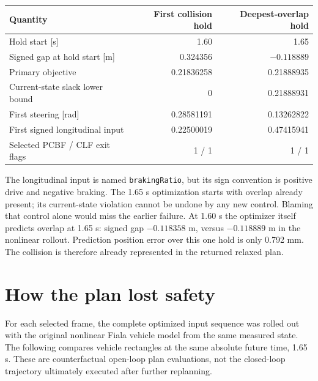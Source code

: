 \documentclass[11pt]{article}
\begin{document}
\begin{center}
\begin{tabular}{lrr}
\toprule
Quantity & First collision hold & Deepest-overlap hold\\
\midrule
Hold start [s] & 1.60 & 1.65\\
Signed gap at hold start [m] & 0.324356 & $-0.118889$\\
Primary objective & 0.21836258 & 0.21888935\\
Current-state slack lower bound & 0 & 0.21888931\\
First steering [rad] & 0.28581191 & 0.13262822\\
First signed longitudinal input & 0.22500019 & 0.47415941\\
Selected PCBF / CLF exit flags & 1 / 1 & 1 / 1\\
\bottomrule
\end{tabular}
\end{center}
The longitudinal input is named \texttt{brakingRatio}, but its sign convention
is positive drive and negative braking. The 1.65 s optimization starts with
overlap already present; its current-state violation cannot be undone by any
new control. Blaming that control alone would miss the earlier failure.
At 1.60 s the optimizer itself predicts overlap at 1.65 s: signed gap
$-0.118358$ m, versus $-0.118889$ m in the nonlinear rollout. Prediction
position error over this one hold is only 0.792 mm. The collision is therefore
already represented in the returned relaxed plan.

\section{How the plan lost safety}
For each selected frame, the complete optimized input sequence was rolled
out with the original nonlinear Fiala vehicle model from the same measured
state. The following compares vehicle rectangles at the same absolute future
time, 1.65 s. These are counterfactual open-loop plan evaluations, not the
closed-loop trajectory ultimately executed after further replanning.
\end{document}
